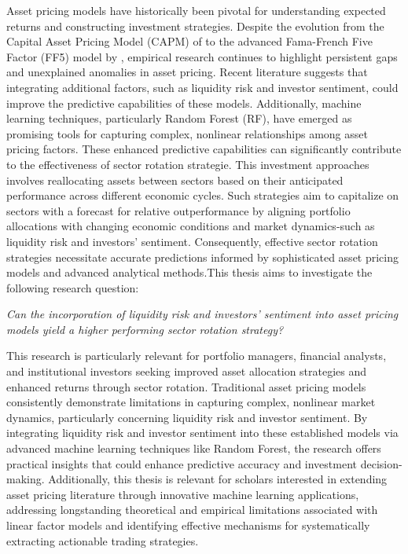 Asset pricing models have historically been pivotal for understanding expected returns and constructing investment strategies. Despite the evolution from the Capital Asset Pricing Model (CAPM) of  to the advanced Fama-French Five Factor (FF5) model by , empirical research continues to highlight persistent gaps and unexplained anomalies in asset pricing. Recent literature suggests that integrating additional factors, such as liquidity risk and investor sentiment, could improve the predictive capabilities of these models. Additionally, machine learning techniques, particularly Random Forest (RF), have emerged as promising tools for capturing complex, nonlinear relationships among asset pricing factors. These enhanced predictive capabilities can significantly contribute to the effectiveness of sector rotation strategie. This investment approaches involves reallocating assets between sectors based on their anticipated performance across different economic cycles. Such strategies aim to capitalize on sectors with a forecast for relative outperformance by aligning portfolio allocations with changing economic conditions and market dynamics-such as liquidity risk and investors' sentiment. Consequently, effective sector rotation strategies necessitate accurate predictions informed by sophisticated asset pricing models and advanced analytical methods.This thesis aims to investigate the following research question: 

\begin{center}
    \textit{Can the incorporation of liquidity risk and investors' sentiment into asset pricing models yield a higher performing sector rotation strategy?}
\end{center}

This research is particularly relevant for portfolio managers, financial analysts, and institutional investors seeking improved asset allocation strategies and enhanced returns through sector rotation. Traditional asset pricing models consistently demonstrate limitations in capturing complex, nonlinear market dynamics, particularly concerning liquidity risk and investor sentiment. By integrating liquidity risk and investor sentiment into these established models via advanced machine learning techniques like Random Forest, the research offers practical insights that could enhance predictive accuracy and investment decision-making. Additionally, this thesis is relevant for scholars interested in extending asset pricing literature through innovative machine learning applications, addressing longstanding theoretical and empirical limitations associated with linear factor models and identifying effective mechanisms for systematically extracting actionable trading strategies.